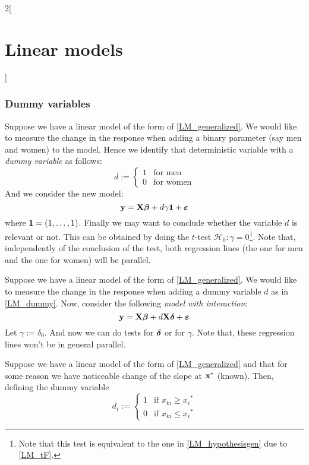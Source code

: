 \documentclass[../../../main_math.tex]{subfiles}
\begin{document}
\begin{multicols}{2}[\section{Linear models}]
  \subsubsection{Dummy variables}
  \begin{definition}
    Suppose we have a linear model of the form of \cref{LM_generalized}. We would like to measure the change in the response when adding a binary parameter (say men and women) to the model. Hence we identify that deterministic variable with a \emph{dummy variable} as follows:
    \begin{equation}\label{LM_dummy}
      d:=
      \begin{cases}
        1 & \text{for men}   \\
        0 & \text{for women}
      \end{cases}
    \end{equation}
    And we consider the new model: $$\boldsymbol{\mathrm{y}}=\boldsymbol{\mathrm{X}}\boldsymbol{\mathrm{\beta}}+d\gamma\boldsymbol{\mathrm{1}}+\boldsymbol{\mathrm{\varepsilon}}$$
    where $\boldsymbol{\mathrm{1}}=(1,\ldots,1)$. Finally we may want to conclude whether the variable $d$ is relevant or not. This can be obtained by doing the $t$-test $\mathcal{H}_0:\gamma=0$\footnote{Note that this test is equivalent to the one in \cref{LM_hypothesisgen} due to \cref{LM_tF}.}. Note that, independently of the conclusion of the test, both regression lines (the one for men and the one for women) will be parallel.
  \end{definition}
  \begin{definition}
    Suppose we have a linear model of the form of \cref{LM_generalized}. We would like to measure the change in the response when adding a dummy variable $d$ as in \cref{LM_dummy}. Now, consider the following \emph{model with interaction}: $$\boldsymbol{\mathrm{y}}=\boldsymbol{\mathrm{X}}\boldsymbol{\mathrm{\beta}}+d\boldsymbol{\mathrm{X}}\boldsymbol{\mathrm{\delta}}+\boldsymbol{\mathrm{\varepsilon}}$$
    Let $\gamma:=\delta_0$. And now we can do tests for $\boldsymbol{\mathrm{\delta}}$ or for $\gamma$. Note that, these regression lines won't be in general parallel.
  \end{definition}
  \begin{definition}
    Suppose we have a linear model of the form of \cref{LM_generalized} and that for some reason we have noticeable change of the slope at $\boldsymbol{\mathrm{x}}^*$ (known). Then, defining the dummy variable
    \begin{equation}
      d_i:=
      \begin{cases}
        1 & \text{if }x_{ki}\geq {x_i}^* \\
        0 & \text{if }x_{ki}\leq {x_i}^*

\end{cases}
\end{equation}
\end{definition}
\end{multicols}
\end{document}
